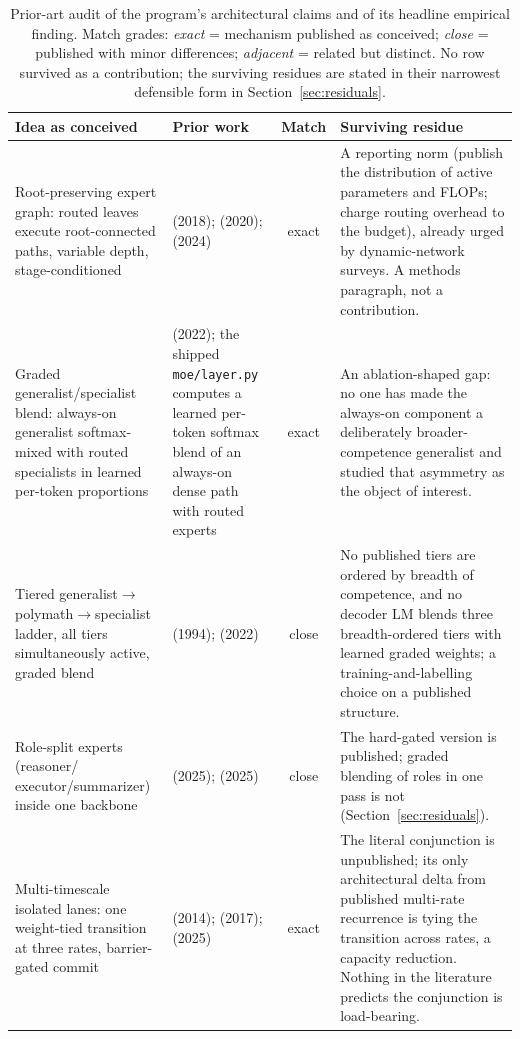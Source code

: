 \documentclass[10pt,a4paper]{article}
\begin{document}
\begin{table}[htbp]
\caption{Prior-art audit of the program's architectural claims and of its headline empirical finding. Match grades: \emph{exact} = mechanism published as conceived; \emph{close} = published with minor differences; \emph{adjacent} = related but distinct. No row survived as a contribution; the surviving residues are stated in their narrowest defensible form in Section~\ref{sec:residuals}.}
\label{tab:prior-art}
\centering\footnotesize
\begin{tabularx}{\textwidth}{@{}>{\raggedright\arraybackslash}p{}>{\raggedright\arraybackslash}p{}c>{\raggedright\arraybackslash}X@{}}
\toprule
Idea as conceived & Prior work & Match & Surviving residue \\
\midrule
Root-preserving expert graph: routed leaves execute root-connected paths, variable depth, stage-conditioned & \cite{rosenbaum2018} (2018); \cite{tang2020ple} (2020); \cite{wang2024home} (2024) & exact & A reporting norm (publish the distribution of active parameters and FLOPs; charge routing overhead to the budget), already urged by dynamic-network surveys. A methods paragraph, not a contribution. \\
\addlinespace
Graded generalist/specialist blend: always-on generalist softmax-mixed with routed specialists in learned per-token proportions & \cite{rajbhandari2022} (2022); the shipped \texttt{moe/layer.py} computes a learned per-token softmax blend of an always-on dense path with routed experts & exact & An ablation-shaped gap: no one has made the always-on component a deliberately broader-competence generalist and studied that asymmetry as the object of interest. \\
\addlinespace
Tiered generalist$\rightarrow$polymath$\rightarrow$specialist ladder, all tiers simultaneously active, graded blend & \cite{jordan1994} (1994); \cite{chronopoulou2022} (2022) & close & No published tiers are ordered by breadth of competence, and no decoder LM blends three breadth-ordered tiers with learned graded weights; a training-and-labelling choice on a published structure. \\
\addlinespace
Role-split experts (reasoner/ executor/summarizer) inside one backbone & \cite{han2025moragent} (2025); \cite{lee2025mapcoderlite} (2025) & close & The hard-gated version is published; graded blending of roles in one pass is not (Section~\ref{sec:residuals}). \\
\addlinespace
Multi-timescale isolated lanes: one weight-tied transition at three rates, barrier-gated commit & \cite{koutnik2014} (2014); \cite{chung2017} (2017); \cite{chen2025parscale} (2025) & exact & The literal conjunction is unpublished; its only architectural delta from published multi-rate recurrence is tying the transition across rates, a capacity reduction. Nothing in the literature predicts the conjunction is load-bearing. \\

\end{tabularx}
\end{table}
\end{document}
